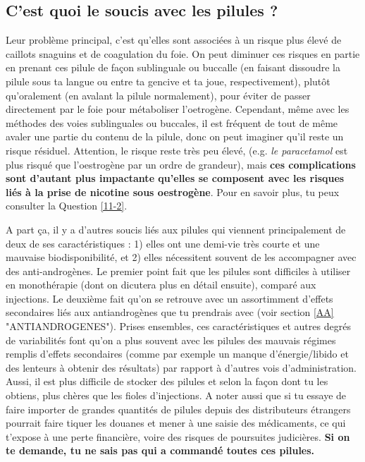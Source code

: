 \documentclass{article}
\begin{document}
\subsection{C'est quoi le soucis avec les pilules ?}

Leur problème principal, c'est qu'elles sont associées à un risque plus élevé de caillots snaguins et de coagulation du foie. On peut diminuer ces risques en partie en prenant ces pilule de façon sublinguale ou buccalle (en faisant dissoudre la pilule sous ta langue ou entre ta gencive et ta joue, respectivement), plutôt qu'oralement (en avalant la pilule normalement), pour éviter de passer directement par le foie pour métaboliser l'oetrogène. Cependant, même avec les méthodes des voies sublinguales ou buccales, il est fréquent de tout de même avaler une partie du contenu de la pilule, donc on peut imaginer qu'il reste un risque résiduel. Attention, le risque reste très peu élevé, (e.g. \textit{le paracetamol} est plus risqué que l'oestrogène par un ordre de grandeur), mais \textbf{ces complications sont d'autant plus impactante qu'elles se composent avec les risques liés à la prise de nicotine sous oestrogène}. Pour en savoir plus, tu peux consulter la Question \ref{11-2}. 

A part ça, il y a d'autres soucis liés aux pilules qui viennent principalement de deux de ses caractéristiques : 1) elles ont une demi-vie très courte et une mauvaise biodisponibilité, et 2) elles nécessitent souvent de les accompagner avec des anti-androgènes. Le premier point fait que les pilules sont difficiles à utiliser en monothérapie (dont on dicutera plus en détail ensuite), comparé aux injections. Le deuxième fait qu'on se retrouve avec un assortimment d'effets secondaires liés aux antiandrogènes que tu prendrais avec (voir section \ref{AA} "ANTIANDROGENES"). Prises ensembles, ces caractéristiques et autres degrés de variabilités font qu'on a plus souvent avec les pilules des mauvais régimes remplis d'effets secondaires (comme par exemple un manque d'énergie/libido et des lenteurs à obtenir des résultats) par rapport à d'autres vois d'administration. Aussi, il est plus difficile de stocker des pilules et selon la façon dont tu les obtiens, plus chères que les fioles d'injections. A noter aussi que si tu essaye de faire importer de grandes quantités de pilules depuis des distributeurs étrangers pourrait faire tiquer les douanes et mener à une saisie des médicaments, ce qui t'expose à une perte financière, voire des risques de poursuites judicières. \textbf{Si on te demande, tu ne sais pas qui a commandé toutes ces pilules.}
\end{document}
